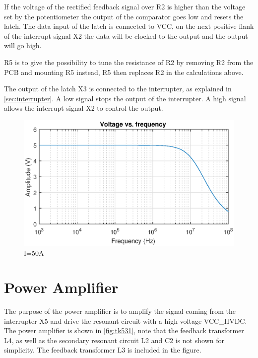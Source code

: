 If the voltage of the rectified feedback signal over R2 is higher than the voltage set by the potentiometer the output of the comparator goes low and resets the latch. The data input of the latch is connected to VCC, on the next positive flank of the interrupt signal X2 the data will be clocked to the output and the output will go high.

R5 is to give the possibility to tune the resistance of R2 by removing R2 from the PCB and mounting R5 instead, R5 then replaces R2 in the calculations above.

The output of the latch X3 is connected to the interrupter, as explained in \cref{sec:interrupter}. A low signal stops the output of the interrupter. A high signal allows the interrupt signal X2 to control the output.


\begin{figure}
    \centering
    \includegraphics[width=\textwidth]{img/LimiterTransfer.eps}
    \caption{I=50A}
    \label{fig:limitertransfer}
\end{figure}




\newpage
\section{Power Amplifier}

The purpose of the power amplifier is to amplify the signal coming from the interrupter X5 and drive the resonant circuit with a high voltage VCC\_HVDC. The power amplifier is shown in \cref{fig:tk531}, note that the feedback transformer L4, as well as the secondary resonant circuit L2 and C2 is not shown for simplicity. The feedback transformer L3 is included in the figure.

